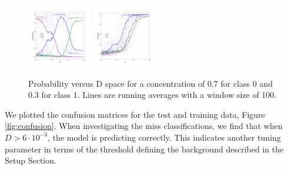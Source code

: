 \documentclass{article}
\begin{document}
\begin{figure}[H]
	\centering
	\includegraphics[width=0.25\textwidth]{DNN_D_vs_prob_6_2.png} \hspace*{-.5cm}
	\includegraphics[width=0.25\textwidth]{DNN_D_vs_act_6.png}	
	\caption{Probability versus D space for a concentration of 0.7 for class 0 and 0.3 for class 1. Lines are running averages with a window size of 100.}
	\label{fig:Dspace}
\end{figure}
%
We plotted the confusion matrices for the test and training data, Figure \ref{fig:confusion}. When investigating the miss classifications, we find that when $D > 6\cdot 10^{-3}$, the model is predicting correctly. This indicates another tuning parameter in terms of the threshold defining the background described in the Setup Section.


\end{document}
